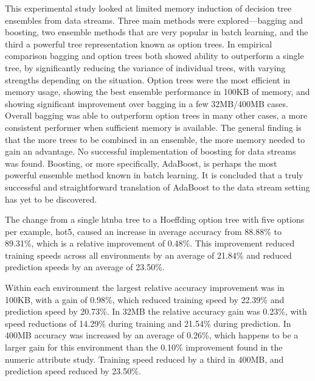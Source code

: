 This experimental study looked at limited memory induction of decision tree ensembles from data streams.
Three main methods were explored---bagging and boosting, two ensemble methods that are very popular in batch learning, and the third a powerful tree representation known as option trees.
In empirical comparison bagging and option trees both showed ability to outperform a single tree, by significantly reducing the variance of individual trees, with varying strengths depending on the situation. Option trees were the most efficient in memory usage, showing the best ensemble performance in 100KB of memory, and showing significant improvement over bagging in a few 32MB/400MB cases. Overall bagging was able to outperform option trees in many other cases, a more consistent performer when sufficient memory is available. The general finding is that the more trees to be combined in an ensemble, the more memory needed to gain an advantage.
No successful implementation of boosting for data streams was found.
Boosting, or more specifically, AdaBoost, is perhaps the most powerful ensemble method known in batch learning. It is concluded that a truly successful and straightforward translation of AdaBoost to the data stream setting has yet to be discovered.

The change from a single {\sc htnba} tree to a Hoeffding option tree with
five options per example, {\sc hot5}, caused an increase in average accuracy
from 88.88\% to 89.31\%, which is a relative improvement of 0.48\%. This improvement reduced training speeds across all environments by an average of 21.84\% and reduced prediction speeds by an average of 23.50\%.

Within each environment the largest relative accuracy improvement was in 100KB, with a gain of 0.98\%, which reduced training speed by 22.39\% and prediction speed by 20.73\%. In 32MB the relative accuracy gain was 0.23\%, with speed reductions of 14.29\% during training and 21.54\% during prediction. In 400MB accuracy was increased by an average of 0.26\%, which happens to be a larger gain for this environment than the 0.10\% improvement found in the numeric attribute study. Training speed reduced by a third in 400MB, and prediction speed reduced by 23.50\%.
